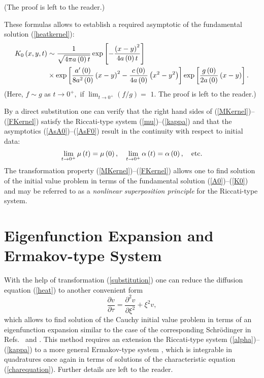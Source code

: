 \documentclass[12pt,reqno]{amsart}
\theoremstyle{plain}
\numberwithin{equation}{section}
\begin{document}
(The proof is left to the reader.)

These formulas allows to establish a required asymptotic of the fundamental
solution (\ref{heatkernel}):\begin{align}
K_{0}\left( x,y,t\right) & \sim \frac{1}{\sqrt{4\pi a\left( 0\right) t}}\exp \left[ -\frac{\left( x-y\right) ^{2}}{4a\left( 0\right) t}\right]
\label{AsK0} \\
& \times \exp \left[ \frac{a^{\prime }\left( 0\right) }{8a^{2}\left(
0\right) }\left( x-y\right) ^{2}-\frac{c\left( 0\right) }{4a\left( 0\right) }\left( x^{2}-y^{2}\right) \right] \exp \left[ \frac{g\left( 0\right) }{2a\left( 0\right) }\left( x-y\right) \right] .  \notag
\end{align}(Here, $f\sim g$ as $t\rightarrow 0^{+},$ if $\lim_{t\rightarrow
0^{+}}\left( f/g\right) =$ $1.$ The proof is left to the reader.)

By a direct substitution one can verify that the right hand sides of (\ref{MKernel})--(\ref{FKernel}) satisfy the Riccati-type system (\ref{mu})--(\ref{kappa}) and that the asymptotics (\ref{AsA0})--(\ref{AsF0}) result in the
continuity with respect to initial data:\begin{equation}
\lim_{t\rightarrow 0^{+}}\mu \left( t\right) =\mu \left( 0\right) ,\quad
\lim_{t\rightarrow 0^{+}}\alpha \left( t\right) =\alpha \left( 0\right)
,\quad \text{etc.\label{lims}}
\end{equation}The transformation property (\ref{MKernel})--(\ref{FKernel}) allows one to
find solution of the initial value problem in terms of the fundamental
solution (\ref{A0})--(\ref{K0}) and may be referred to as a \textit{nonlinear superposition principle} for the Riccati-type system.

\section{Eigenfunction Expansion and Ermakov-type System}

With the help of transformation (\ref{substitution}) one can reduce the
diffusion equation (\ref{heat}) to another convenient form\begin{equation}
\frac{\partial v}{\partial \tau }=\frac{\partial ^{2}v}{\partial \xi ^{2}}+\xi ^{2}v,  \label{harmonic}
\end{equation}which allows to find solution of the Cauchy initial value problem in terms
of an eigenfunction expansion similar to the case of the corresponding Schr\"{o}dinger in Refs.~\cite{Lan:Lop:Sus} and \cite{Suslov10}. This method
requires an extension the Riccati-type system (\ref{alpha})--(\ref{kappa})
to a more general Ermakov-type system \cite{Lan:Lop:Sus}, which is
integrable in quadratures once again in terms of solutions of the
characteristic equation (\ref{charequation}). Further details are left to
the reader.
\end{document}
